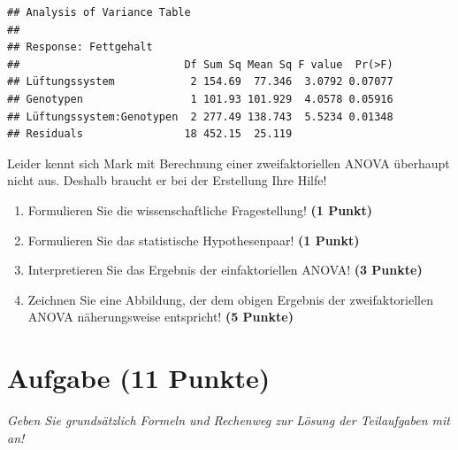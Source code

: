 \documentclass[a4paper, 9pt]{scrartcl}\usepackage[]{graphicx}\usepackage[]{xcolor}
\makeatletter
\newenvironment{kframe}{%
 \def\at@end@of@kframe{}%
 \ifinner\ifhmode%
  \def\at@end@of@kframe{\end{minipage}}%
  \begin{minipage}{\columnwidth}%
 \fi\fi%
 \def\FrameCommand##1{\hskip\@totalleftmargin \hskip-\fboxsep
 \colorbox{shadecolor}{##1}\hskip-\fboxsep
     \hskip-\linewidth \hskip-\@totalleftmargin \hskip\columnwidth}%
 \MakeFramed {\advance\hsize-\width
   \@totalleftmargin\z@ \linewidth\hsize
   \@setminipage}}%
 {\par\unskip\endMakeFramed%
 \at@end@of@kframe}
\newenvironment{knitrout}{}{} %
\makeatother
\begin{document}
\begin{knitrout}
\color{fgcolor}\begin{kframe}
\begin{verbatim}
## Analysis of Variance Table
## 
## Response: Fettgehalt
##                          Df Sum Sq Mean Sq F value  Pr(>F)
## Lüftungssystem            2 154.69  77.346  3.0792 0.07077
## Genotypen                 1 101.93 101.929  4.0578 0.05916
## Lüftungssystem:Genotypen  2 277.49 138.743  5.5234 0.01348
## Residuals                18 452.15  25.119
\end{verbatim}
\end{kframe}
\end{knitrout}

\vspace{1ex}

Leider kennt sich Mark mit Berechnung einer zweifaktoriellen ANOVA überhaupt nicht aus. Deshalb braucht er bei der Erstellung Ihre Hilfe! 

\begin{enumerate}
  \item Formulieren Sie die wissenschaftliche Fragestellung! \textbf{(1 Punkt)}
  \item Formulieren Sie das statistische Hypothesenpaar! \textbf{(1 Punkt)}
\item Interpretieren Sie das Ergebnis der einfaktoriellen ANOVA! \textbf{(3 Punkte)} 
\item Zeichnen Sie eine Abbildung, der dem obigen Ergebnis der
  zweifaktoriellen ANOVA näherungsweise entspricht! \textbf{(5 Punkte)}
\end{enumerate}
 
\clearpage

\section{Aufgabe \hfill (11 Punkte)}

\textit{Geben Sie grundsätzlich Formeln und Rechenweg zur Lösung der Teilaufgaben mit an!} \\[1Ex]
 
\end{document}
